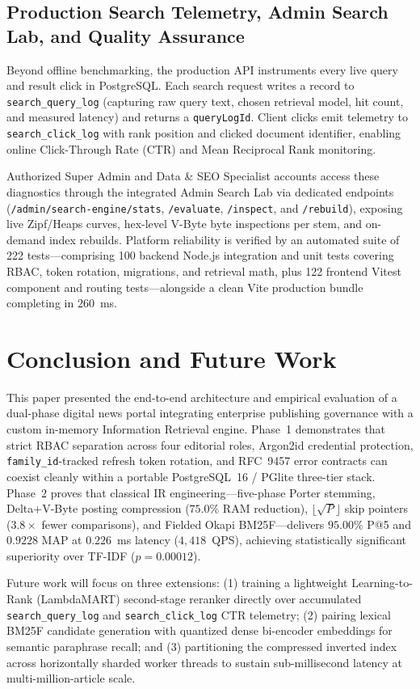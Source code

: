 \documentclass[conference]{IEEEtran}
\begin{document}
\subsection{Production Search Telemetry, Admin Search Lab, and Quality Assurance}
Beyond offline benchmarking, the production API instruments every live query and result click in PostgreSQL. Each search request writes a record to \texttt{search\_query\_log} (capturing raw query text, chosen retrieval model, hit count, and measured latency) and returns a \texttt{queryLogId}. Client clicks emit telemetry to \texttt{search\_click\_log} with rank position and clicked document identifier, enabling online Click-Through Rate (CTR) and Mean Reciprocal Rank monitoring.

Authorized Super Admin and Data \& SEO Specialist accounts access these diagnostics through the integrated Admin Search Lab via dedicated endpoints (\texttt{/admin/search-engine/stats}, \texttt{/evaluate}, \texttt{/inspect}, and \texttt{/rebuild}), exposing live Zipf/Heaps curves, hex-level V-Byte byte inspections per stem, and on-demand index rebuilds. Platform reliability is verified by an automated suite of 222 tests—comprising 100 backend Node.js integration and unit tests covering RBAC, token rotation, migrations, and retrieval math, plus 122 frontend Vitest component and routing tests—alongside a clean Vite production bundle completing in $260$~ms.

\section{Conclusion and Future Work}
This paper presented the end-to-end architecture and empirical evaluation of a dual-phase digital news portal integrating enterprise publishing governance with a custom in-memory Information Retrieval engine. Phase~1 demonstrates that strict RBAC separation across four editorial roles, Argon2id credential protection, \texttt{family\_id}-tracked refresh token rotation, and RFC~9457 error contracts can coexist cleanly within a portable PostgreSQL~16 / PGlite three-tier stack. Phase~2 proves that classical IR engineering—five-phase Porter stemming, Delta+V-Byte posting compression ($75.0\%$ RAM reduction), $\lfloor\sqrt{P}\rfloor$ skip pointers ($3.8\times$ fewer comparisons), and Fielded Okapi BM25F—delivers $95.00\%$ P@5 and $0.9228$ MAP at $0.226$~ms latency ($4{,}418$~QPS), achieving statistically significant superiority over TF-IDF ($p = 0.00012$).

Future work will focus on three extensions: (1) training a lightweight Learning-to-Rank (LambdaMART) second-stage reranker directly over accumulated \texttt{search\_query\_log} and \texttt{search\_click\_log} CTR telemetry; (2) pairing lexical BM25F candidate generation with quantized dense bi-encoder embeddings for semantic paraphrase recall; and (3) partitioning the compressed inverted index across horizontally sharded worker threads to sustain sub-millisecond latency at multi-million-article scale.
\end{document}
